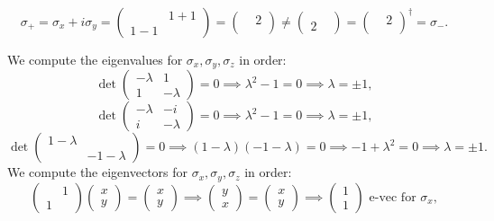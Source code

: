 \documentclass[11pt, letterpaper]{article}
\begin{document}
\[
	\sigma _+=\sigma _x + i\sigma _y = \begin{pmatrix}
	 & 1 + 1 \\
	1 - 1 & 
	\end{pmatrix}=\begin{pmatrix}
	 & 2 \\
	 & 
	\end{pmatrix} \neq \begin{pmatrix}
	 &  \\
	2 & 
	\end{pmatrix} = \begin{pmatrix}
	 & 2 \\
	 & 
	\end{pmatrix}^\dagger = \sigma _-
.\]


We compute the eigenvalues for $\sigma _x,\sigma _y,\sigma _z$ in order:
\[
\det \begin{pmatrix}
-\lambda  & 1 \\
1 & -\lambda 
\end{pmatrix}=0 \implies \lambda ^2 - 1 = 0 \implies \lambda =\pm 1,
\]
\[
	\det \begin{pmatrix}
	-\lambda  & -i \\
	i & -\lambda 
	\end{pmatrix}=0\implies \lambda ^2 - 1 = 0 \implies \lambda =\pm 1
,\]
\[
	\det \begin{pmatrix}
	1-\lambda  &  \\
	 & -1-\lambda 
	\end{pmatrix}=0 \implies \left( 1-\lambda  \right)\left( -1-\lambda  \right) =0 \implies -1 + \lambda ^2 = 0 \implies \lambda =\pm 1
.\]
We compute the eigenvectors for $\sigma _x,\sigma _y,\sigma _z$ in order:
\[
	\begin{pmatrix}
	 & 1 \\
	1 & 
	\end{pmatrix}\begin{pmatrix}
	x \\
	y
	\end{pmatrix}=\begin{pmatrix}
	x \\
	y
	\end{pmatrix}\implies \begin{pmatrix}
	y \\
	x
	\end{pmatrix}=\begin{pmatrix}
	x \\
	y
	\end{pmatrix} \implies \begin{pmatrix}
	1 \\
	1
	\end{pmatrix} \text{ e-vec for } \sigma _x,
\]
\end{document}
